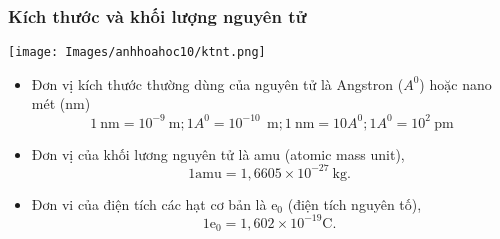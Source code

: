 \subsubsection{Kích thước và khối lượng nguyên tử}
\begin{center}
	\texttt{[image: Images/anhhoahoc10/ktnt.png]}\\
	\label{fig:m-q-hatcoban}
\end{center}
\vspace*{0.25cm}
\begin{note}
	\begin{itemize}
		\item Đơn vị kích thước thường dùng của nguyên tử là Angstron ($ A^0 $) hoặc nano mét (nm)			
		$$1 \mathrm{~nm}=10^{-9}~\mathrm{m} ; 1 A^0=10^{-10}~\mathrm{~m} ; 1 \mathrm{~nm}=10 A^0; 1 A^0=10^{2}~\mathrm{pm}$$
		\begin{center}
		\end{center}
		\item Đơn vị của khối lương nguyên tử là amu (atomic mass unit),
		$$
		1 \mathrm{amu}=1,6605 \times 10^{-27} \mathrm{~kg} \text {. }
		$$
		\item Đơn vi của điện tích các hạt cơ bản là $\mathrm{e}_0$ (điện tích nguyên tố),
		$$
		1 \mathrm{e}_0=1,602 \times 10^{-19} \mathrm{C} \text {. }
		$$
	\end{itemize}
\end{note}
\newpage
